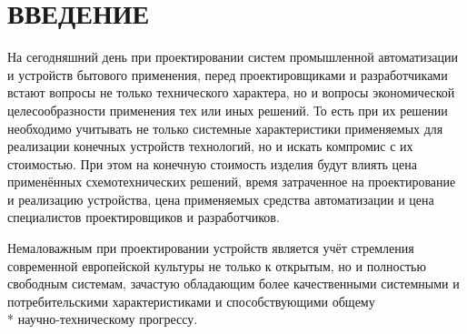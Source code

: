 \section*{ВВЕДЕНИЕ}
\begin{par}
На сегодняшний день при проектировании систем промышленной автоматизации и устройств
бытового применения, перед проектировщиками и разработчиками встают вопросы не только технического
характера, но и вопросы экономической целесообразности применения тех или иных решений.
То есть при их решении необходимо учитывать не только системные характеристики применяемых для
реализации конечных устройств технологий, но и искать компромис с их стоимостью. При этом
на конечную стоимость изделия будут влиять цена применённых схемотехнических решений,
время затраченное на проектирование и реализацию устройства, цена применяемых средства автоматизации
и цена специалистов проектировщиков и разработчиков.
\end{par}

\begin{par}
Немаловажным при проектировании устройств является учёт стремления
современной европейской культуры не только к открытым, но и полностью свободным системам,
зачастую обладающим более качественными системными и
потребительскими характеристиками и способствующими общему\\*
научно-техническому прогрессу\cite{lessing}.
\end{par}
\newpage{}

